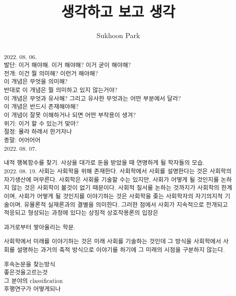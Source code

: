 \documentclass[12pt, a4paper]{article}
\begin{document}
\title{생각하고 보고 생각}
\author{Sukhoon Park}
\maketitle

\begin{abstract}

2022. 08. 06. \\
발단: 이거 해야해. 이거 해야해? 이거 굳이 해야해? \\
전개: 이건 뭘 의미해? 이런거 해야해? \\
이 개념은 무엇을 의미해? \\
반대로 이 개념은 뭘 의미하고 있지 않는거야? \\
이 개념은 무엇과 유사해? 그리고 유사한 무엇과는 어떤 부분에서 달라? \\
이 개념은 반드시 존재해야해? \\
이 개념이 잘못 이해하거나 되면 어떤 부작용이 생겨? \\
위기: 이거 할 수 있는거 맞아? \\
절정: 몰라 하래서 한거자나 \\
종말: 어어어어 \\

2022. 08. 07.

내적 행복함수를 찾기. 사상을 대가로 돈을 받았을 때 연명하게 될 학자들의 모습. \\


2022. 08. 19.
사회는 사회학을 위해 존재한다. 사회학에서 사회를 설명한다는 것은 사회학의 자기생산에 머무른다. 사회학은 사회를 기술할 수는 있지만, 사회가 어떻게 될 것인지를 논하지 않는 것은 사회학이 볼것이 없기 때문이다. 사회적 질서를 논하는 것까지가 사회학의 한계이며, 사회가 어떻게 될 것인지를 이야기하는 것은 사회학을 좆는 사회학자의 자기의지적 기술이며, 유물론적 실재론과의 결별을 의미한다. 그러한 점에서 사회가 지속적으로 전개되고 적응되고 형성되는 과정에 있다는 상징적 상호작용론의 입장은 

과거로부터 쌓아올리는 학문. 

사회학에서 미래를 이야기하는 것은 미래 사회를 기술하는 것인데 그 방식을 사회학에서 사회를 설명하는 과거의 축적 방식으로 이야기를 하기에 그 미래의 시점을 구분하지 않는다. 

후속논문을 찾는방식 \\
좋은것을고르는것 \\
그 분야의 classification \\
후행연구가 어떻게되나 \\


\end{abstract}
\end{document}
